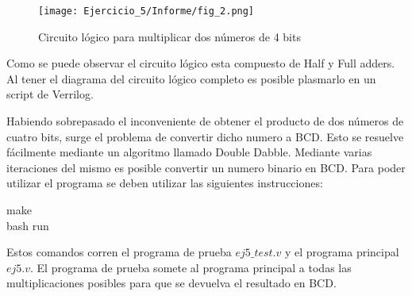 \begin{figure}[h!]                                                       
    \centering\texttt{[image: Ejercicio\_5/Informe/fig\_2.png]}
     \caption{Circuito lógico para multiplicar dos números de 4 bits}
     \label{circuito_logico}
     \end{figure}



Como se puede observar el circuito lógico esta compuesto de Half y Full adders. Al tener el diagrama del circuito lógico completo es posible plasmarlo en un script de Verrilog.

Habiendo sobrepasado el inconveniente de obtener el producto de dos números de cuatro bits, surge el problema de convertir dicho numero a BCD. Esto se resuelve fácilmente mediante un algoritmo llamado
Double Dabble. Mediante varias iteraciones del mismo es posible convertir un numero binario en BCD. Para poder utilizar el programa se deben utilizar las siguientes instrucciones: 

\begin{center}
    make\\
    bash run
\end{center}

Estos comandos corren el programa de prueba $ej5\_test.v$ y el programa principal $ej5.v$. 
El programa de prueba somete al programa principal a todas las multiplicaciones posibles para que se devuelva el resultado en BCD.  

